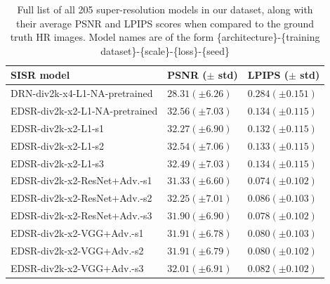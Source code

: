 \documentclass[10pt]{article} %
\begin{document}
\begin{longtable}{| p{} | p{} | p{} |} 
\caption{Full list of all 205 super-resolution models in our dataset, along with their average PSNR and LPIPS scores when compared to the ground truth HR images. Model names are of the form \{architecture\}-\{training dataset\}-\{scale\}-\{loss\}-\{seed\} }
\label{tab:all_205_model_psnr_lpips}
\tabularnewline

\hline
SISR model & PSNR ($\pm$ std) & LPIPS ($\pm$ std) \\
\hline
\hline
DRN-div2k-x4-L1-NA-pretrained & $28.31 (\pm 6.26)$ & $0.284 (\pm 0.151)$ \\
EDSR-div2k-x2-L1-NA-pretrained & $32.56 (\pm 7.03)$ & $0.134 (\pm 0.115)$ \\
EDSR-div2k-x2-L1-s1 & $32.27 (\pm 6.90)$ & $0.132 (\pm 0.115)$ \\
EDSR-div2k-x2-L1-s2 & $32.54 (\pm 7.06)$ & $0.133 (\pm 0.115)$ \\

EDSR-div2k-x2-L1-s3 & $32.49 (\pm 7.03)$ & $0.134 (\pm 0.115)$ \\
EDSR-div2k-x2-ResNet+Adv.-s1 & $31.33 (\pm 6.60)$ & $0.074 (\pm 0.102)$ \\
EDSR-div2k-x2-ResNet+Adv.-s2 & $32.25 (\pm 7.01)$ & $0.086 (\pm 0.103)$ \\
EDSR-div2k-x2-ResNet+Adv.-s3 & $31.90 (\pm 6.90)$ & $0.078 (\pm 0.102)$ \\
EDSR-div2k-x2-VGG+Adv.-s1 & $31.91 (\pm 6.78)$ & $0.080 (\pm 0.103)$ \\
EDSR-div2k-x2-VGG+Adv.-s2 & $31.91 (\pm 6.79)$ & $0.080 (\pm 0.102)$ \\
EDSR-div2k-x2-VGG+Adv.-s3 & $32.01 (\pm 6.91)$ & $0.082 (\pm 0.102)$ \\


\end{longtable}
\end{document}
